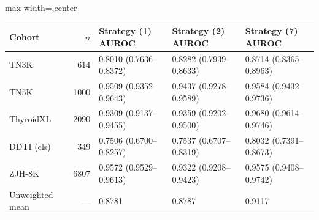 \begin{responsetable}
\caption{}
\begin{adjustbox}{max width=\textwidth,center}
\begin{tabular}{@{}l r l l l@{}}
\toprule
Cohort & $n$ & Strategy (1) AUROC & Strategy (2) AUROC & Strategy (7) AUROC \\
\midrule
TN3K & 614 & 0.8010 (0.7636--0.8372) & 0.8282 (0.7939--0.8633) & 0.8714 (0.8365--0.8963) \\
TN5K & 1000 & 0.9509 (0.9352--0.9643) & 0.9437 (0.9278--0.9589) & 0.9584 (0.9432--0.9736) \\
ThyroidXL & 2090 & 0.9309 (0.9137--0.9455) & 0.9359 (0.9202--0.9500) & 0.9680 (0.9614--0.9746) \\
DDTI (cls) & 349 & 0.7506 (0.6700--0.8257) & 0.7537 (0.6707--0.8319) & 0.8032 (0.7391--0.8673) \\
ZJH-8K & 6807 & 0.9572 (0.9529--0.9613) & 0.9322 (0.9208--0.9423) & 0.9575 (0.9408--0.9742) \\
\midrule
Unweighted mean & --- & 0.8781 & 0.8787 & 0.9117 \\
\bottomrule
\end{tabular}
\end{adjustbox}
\end{responsetable}
